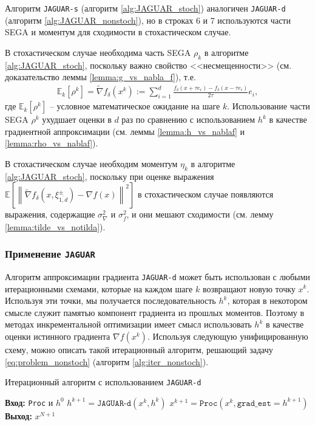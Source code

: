     Алгоритм \texttt{JAGUAR-s} (алгоритм \ref{alg:JAGUAR_stoch}) аналогичен \texttt{JAGUAR-d} (алгоритм \ref{alg:JAGUAR_nonstoch}), но в строках 6 и 7 используются части SEGA \cite{hanzely2018sega} и моментум \cite{mokhtari2020stochastic} для сходимости в стохастическом случае.

    В стохастическом случае необходима часть SEGA \cite{hanzely2018sega} $\rho_k$ в алгоритме \ref{alg:JAGUAR_stoch}, поскольку важно свойство <<несмещенности>> (см. доказательство леммы \ref{lemma:g_vs_nabla_f}), т.е.
    \begin{align*}
       \mathbb{E}_k \left[ \rho^k \right] = \widetilde{\nabla} f_\delta (x^k) := \sum\limits_{i = 1}^{d} \frac{f_\delta (x + \tau e_i) - f_\delta(x - \tau e_i)}{2 \tau} e_i, 
    \end{align*}
    где $\mathbb{E}_k \left[ \rho^k \right]$ -- условное математическое ожидание на шаге $k$. Использование части SEGA $\rho^k$ ухудшает оценки в $d$ раз по сравнению с использованием $h^k$ в качестве градиентной аппроксимации (см. леммы \ref{lemma:h_vs_nablaf} и \ref{lemma:rho_vs_nablaf}).

    В стохастическом случае необходим моментум \cite{mokhtari2020stochastic} $\eta_k$ в алгоритме \ref{alg:JAGUAR_stoch}, поскольку при оценке выражения $\mathbb{E} \left[ \left\| \widetilde{\nabla} f_\delta (x, \xi_{\overline{1, d}}^\pm) - \nabla f(x) \right\|^2 \right]$ в стохастическом случае появляются выражения, содержащие $\sigma_\nabla^2$ и $\sigma_f^2$, и они мешают сходимости (см. лемму \ref{lemma:tilde_vs_notilda}).

\subsubsection{Применение \texttt{JAGUAR}}

    Алгоритм аппроксимации градиента \texttt{JAGUAR-d} может быть использован с любыми итерационными схемами, которые на каждом шаге $k$ возвращают новую точку $x^k$. Используя эти точки, мы получается последовательность $h^k$, которая в некотором смысле служит памятью компонент градиента из прошлых моментов. Поэтому в методах инкрементальной оптимизации имеет смысл использовать $h^k$ в качестве оценки истинного градиента $\nabla f(x^k)$. Используя следующую унифицированную схему, можно описать такой итерационный алгоритм, решающий задачу \eqref{eq:problem_nonstoch} (алгоритм \ref{alg:iter_nonstoch}).
        
    \begin{algorithm}[H]
        \caption{Итерационный алгоритм с использованием \texttt{JAGUAR-d}} \label{alg:iter_nonstoch}
        \begin{algorithmic}[1]
            \State \textbf{Вход:} \texttt{Proc} и $h^0$
                \State $h^{k + 1} = \texttt{JAGUAR-d}(x^k, h^k)$
                \State $x^{k + 1} = \texttt{Proc}(x^k, \texttt{grad\_est} = h^{k + 1})$
            \EndFor
            \State \textbf{Выход:} $x^{N + 1}$
        \end{algorithmic}
    \end{algorithm}

